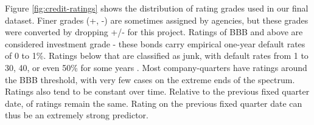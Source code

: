 \documentclass{article}[11pt]
\begin{document}
    Figure \ref{fig:credit-ratings} shows the distribution of rating grades used in our final dataset. Finer grades (+, -) are sometimes assigned by agencies, but these grades were converted by dropping +/- for this project. Ratings of BBB and above are considered investment grade - these bonds carry empirical one-year default rates of 0 to 1\%. Ratings below that are classified as junk, with default rates from 1 to 30, 40, or even 50\% for some years \citep{s_and_p_global_ratings_s_2024}. Most company-quarters have ratings around the BBB threshold, with very few cases on the extreme ends of the spectrum. Ratings also tend to be constant over time. Relative to the previous fixed quarter date, \shareNotChanges \space of ratings remain the same. Rating on the previous fixed quarter date can thus be an extremely strong predictor.
\end{document}
